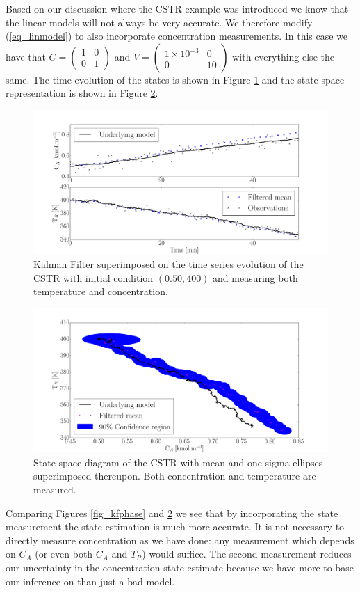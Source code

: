 \documentclass[../masters.tex]{subfiles}
\begin{document}
Based on our discussion where the CSTR example was introduced we know that the linear models will not always be very accurate. We therefore modify (\ref{eq_linmodel}) to also incorporate concentration measurements. In this case we have that $C = \begin{pmatrix}
1 & 0\\0 &1
\end{pmatrix}$ and $V = \begin{pmatrix}
1\times 10^{-3} & 0\\0 & 10
\end{pmatrix}$ with everything else the same. The time evolution of the states is shown in Figure \ref{fig_kftime2} and the state space representation is shown in Figure \ref{fig_kfphase2}. 
\begin{figure}[H] 
\centering
\includegraphics[scale=0.30]{kalman_filter_timeseries_M2.pdf}
\caption{Kalman Filter superimposed on the time series evolution of the CSTR with initial condition $(0.50, 400)$ and measuring both temperature and concentration.}
\label{fig_kftime2}
\end{figure}
\begin{figure}[H] 
\centering
\includegraphics[scale=0.30]{kalman_filter_phase_M2.pdf}
\caption{State space diagram of the CSTR with mean and one-sigma ellipses superimposed thereupon. Both concentration and temperature are measured.}
\label{fig_kfphase2}
\end{figure}
Comparing Figures \ref{fig_kfphase} and \ref{fig_kfphase2} we see that by incorporating the state measurement the state estimation is much more accurate. It is not necessary to directly measure concentration as we have done: any measurement which depends on $C_A$ (or even both $C_A$ and $T_R$) would suffice. The second measurement reduces our uncertainty in the concentration state estimate because we have more to base our inference on than just a bad model.  
\end{document}
